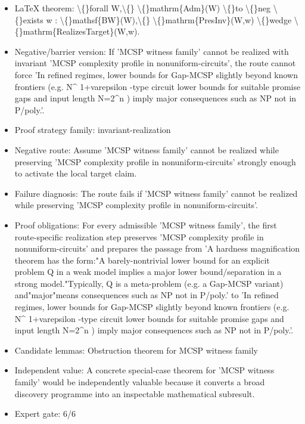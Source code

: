 \documentclass[11pt]{article}
\begin{document}
\begin{itemize}
\item LaTeX theorem: \textbackslash\{\}forall W,\textbackslash\{\} \textbackslash\{\}mathrm\{Adm\}(W) \textbackslash\{\}to \textbackslash\{\}neg \textbackslash\{\}exists w : \textbackslash\{\}mathsf\{BW\}(W),\textbackslash\{\} \textbackslash\{\}mathrm\{PresInv\}(W,w) \textbackslash\{\}wedge \textbackslash\{\}mathrm\{RealizesTarget\}(W,w).
\item Negative/barrier version: If 'MCSP witness family' cannot be realized with invariant 'MCSP complexity profile in nonuniform-circuits', the route cannot force 'In refined regimes, lower bounds for Gap-MCSP slightly beyond known frontiers (e.g. N\textasciicircum{} 1+varepsilon -type circuit lower bounds for suitable promise gaps and input length N=2\textasciicircum{}n ) imply major consequences such as NP not in P/poly.'.
\item Proof strategy family: invariant-realization
\item Negative route: Assume 'MCSP witness family' cannot be realized while preserving 'MCSP complexity profile in nonuniform-circuits' strongly enough to activate the local target claim.
\item Failure diagnosis: The route fails if 'MCSP witness family' cannot be realized while preserving 'MCSP complexity profile in nonuniform-circuits'.
\item Proof obligations: For every admissible 'MCSP witness family', the first route-specific realization step preserves 'MCSP complexity profile in nonuniform-circuits' and prepares the passage from 'A hardness magnification theorem has the form:"A barely-nontrivial lower bound for an explicit problem Q in a weak model implies a major lower bound/separation in a strong model."Typically, Q is a meta-problem (e.g. a Gap-MCSP variant) and"major"means consequences such as NP not in P/poly.' to 'In refined regimes, lower bounds for Gap-MCSP slightly beyond known frontiers (e.g. N\textasciicircum{} 1+varepsilon -type circuit lower bounds for suitable promise gaps and input length N=2\textasciicircum{}n ) imply major consequences such as NP not in P/poly.'.
\item Candidate lemmas: Obstruction theorem for MCSP witness family
\item Independent value: A concrete special-case theorem for 'MCSP witness family' would be independently valuable because it converts a broad discovery programme into an inspectable mathematical subresult.
\item Expert gate: 6/6
\end{itemize}
\end{document}
